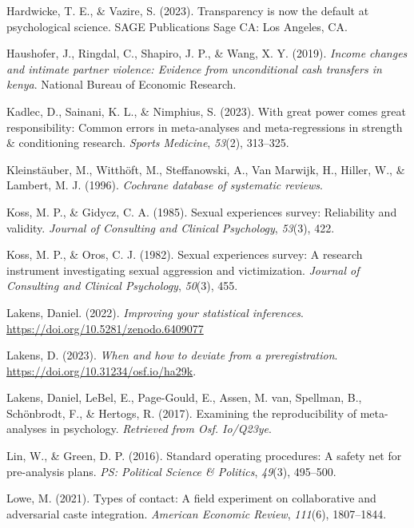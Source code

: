 \documentclass[
  man]{apa6}
\newlength{\cslhangindent}
\newenvironment{CSLReferences}[2] %
 {\begin{list}{}{%
  \setlength{\itemindent}{0pt}
  \setlength{\leftmargin}{0pt}
  \setlength{\parsep}{0pt}
  \ifodd #1
   \setlength{\leftmargin}{\cslhangindent}
   \setlength{\itemindent}{-1\cslhangindent}
  \fi
  \setlength{\itemsep}{#2\baselineskip}}}
 {\end{list}}
\begin{document}
\begin{CSLReferences}{1}{0}
Hardwicke, T. E., \& Vazire, S. (2023). Transparency is now the default at psychological science. SAGE Publications Sage CA: Los Angeles, CA.

Haushofer, J., Ringdal, C., Shapiro, J. P., \& Wang, X. Y. (2019). \emph{Income changes and intimate partner violence: Evidence from unconditional cash transfers in kenya}. National Bureau of Economic Research.

Kadlec, D., Sainani, K. L., \& Nimphius, S. (2023). With great power comes great responsibility: Common errors in meta-analyses and meta-regressions in strength \& conditioning research. \emph{Sports Medicine}, \emph{53}(2), 313--325.

Kleinstäuber, M., Witthöft, M., Steffanowski, A., Van Marwijk, H., Hiller, W., \& Lambert, M. J. (1996). \emph{Cochrane database of systematic reviews}.

Koss, M. P., \& Gidycz, C. A. (1985). Sexual experiences survey: Reliability and validity. \emph{Journal of Consulting and Clinical Psychology}, \emph{53}(3), 422.

Koss, M. P., \& Oros, C. J. (1982). Sexual experiences survey: A research instrument investigating sexual aggression and victimization. \emph{Journal of Consulting and Clinical Psychology}, \emph{50}(3), 455.

Lakens, Daniel. (2022). \emph{Improving your statistical inferences}. \url{https://doi.org/10.5281/zenodo.6409077}

Lakens, D. (2023). \emph{When and how to deviate from a preregistration}. \url{https://doi.org/10.31234/osf.io/ha29k}.

Lakens, Daniel, LeBel, E., Page-Gould, E., Assen, M. van, Spellman, B., Schönbrodt, F., \& Hertogs, R. (2017). Examining the reproducibility of meta-analyses in psychology. \emph{Retrieved from Osf. Io/Q23ye}.

Lin, W., \& Green, D. P. (2016). Standard operating procedures: A safety net for pre-analysis plans. \emph{PS: Political Science \& Politics}, \emph{49}(3), 495--500.

Lowe, M. (2021). Types of contact: A field experiment on collaborative and adversarial caste integration. \emph{American Economic Review}, \emph{111}(6), 1807--1844.


\end{CSLReferences}
\end{document}
